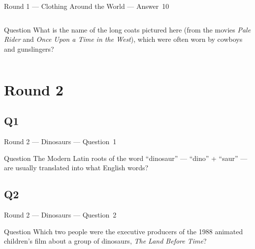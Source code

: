 \documentclass[11pt]{beamer}
\begin{document}
\begin{frame}[t]{Round 1 --- Clothing Around the World --- \mbox{Answer 10}}
\vspace{-0.5em}
\begin{columns}[T,totalwidth=\linewidth]
\begin{column}{0.32\linewidth}
\begin{block}{Question}
What is the name of the long coats pictured here (from the movies \emph{Pale Rider} and \emph{Once Upon a Time in the West}), which were often worn by cowboys and gunslingers?
\end{block}
\end{column}
\begin{column}{0.65\linewidth}
\begin{center}
\texttt{[image: \{Images/duster]}.jpg}
\end{center}
\end{column}
\end{columns}
\end{frame}
\def\thisSectionName{Dinosaurs}
\section{Round 2}
\subsection*{Q1}
\begin{frame}[t]{Round 2 --- Dinosaurs --- \mbox{Question 1}}
\vspace{-0.5em}
\begin{block}{Question}
The Modern Latin roots of the word ``dinosaur'' --- ``dino'' + ``saur'' --- are usually translated into what English words?
\end{block}
\end{frame}
\subsection*{Q2}
\begin{frame}[t]{Round 2 --- Dinosaurs --- \mbox{Question 2}}
\vspace{-0.5em}
\begin{block}{Question}
Which two people were the executive producers of the 1988 animated children's film about a group of dinosaurs, \emph{The Land Before Time}?
\end{block}
\end{frame}
\end{document}
